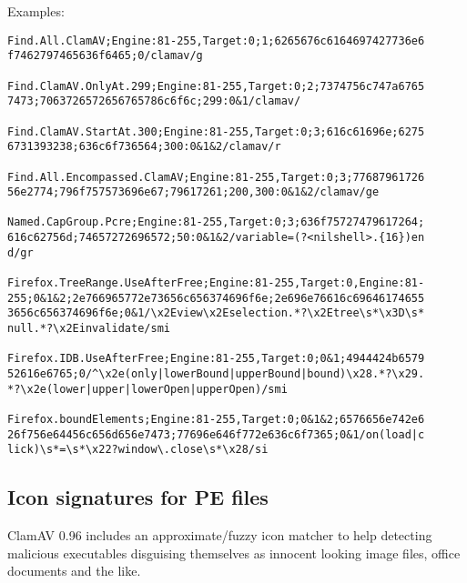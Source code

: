 \documentclass[a4paper,titlepage,12pt]{article}
\begin{document}
    Examples:
    \begin{verbatim}
Find.All.ClamAV;Engine:81-255,Target:0;1;6265676c6164697427736e6
f7462797465636f6465;0/clamav/g

Find.ClamAV.OnlyAt.299;Engine:81-255,Target:0;2;7374756c747a6765
7473;7063726572656765786c6f6c;299:0&1/clamav/

Find.ClamAV.StartAt.300;Engine:81-255,Target:0;3;616c61696e;6275
6731393238;636c6f736564;300:0&1&2/clamav/r

Find.All.Encompassed.ClamAV;Engine:81-255,Target:0;3;77687961726
56e2774;796f757573696e67;79617261;200,300:0&1&2/clamav/ge

Named.CapGroup.Pcre;Engine:81-255,Target:0;3;636f75727479617264;
616c62756d;74657272696572;50:0&1&2/variable=(?<nilshell>.{16})en
d/gr

Firefox.TreeRange.UseAfterFree;Engine:81-255,Target:0,Engine:81-
255;0&1&2;2e766965772e73656c656374696f6e;2e696e76616c69646174655
3656c656374696f6e;0&1/\x2Eview\x2Eselection.*?\x2Etree\s*\x3D\s*
null.*?\x2Einvalidate/smi

Firefox.IDB.UseAfterFree;Engine:81-255,Target:0;0&1;4944424b6579
52616e6765;0/^\x2e(only|lowerBound|upperBound|bound)\x28.*?\x29.
*?\x2e(lower|upper|lowerOpen|upperOpen)/smi

Firefox.boundElements;Engine:81-255,Target:0;0&1&2;6576656e742e6
26f756e64456c656d656e7473;77696e646f772e636c6f7365;0&1/on(load|c
lick)\s*=\s*\x22?window\.close\s*\x28/si
    \end{verbatim}

    \subsection{Icon signatures for PE files}
    ClamAV 0.96 includes an approximate/fuzzy icon matcher to help
    detecting malicious executables disguising themselves as innocent
    looking image files, office documents and the like.
\end{document}
